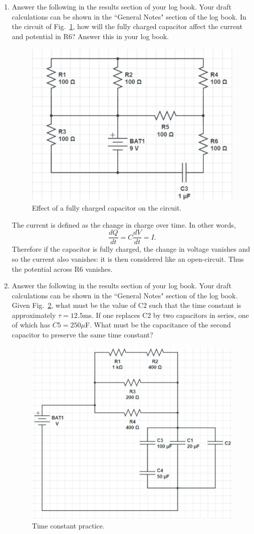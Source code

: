 \documentclass[12pt]{report}
\begin{document}
\begin{enumerate}
\item Answer the following in the results section of your log book. Your draft calculations can be shown in the ``General Notes" section of the log book. In the circuit of Fig.~\ref{Fig:lab2-session1-Rpractice}, how will the fully charged capacitor affect the current and potential in R6? Answer this in your log book.
\begin{figure}[h]
\centering
\includegraphics[width=0.6\linewidth]{lab2-session1-Rpractice}
\caption{Effect of a fully charged capacitor on the circuit.}
\label{Fig:lab2-session1-Rpractice}
\end{figure}

\begin{tcolorbox}[title=Answer]
The current is defined as the change in charge over time. In other words,
\begin{equation}
\frac{dQ}{dt} = C \frac{dV}{dt} = I.
\end{equation}
Therefore if the capacitor is fully charged, the change in voltage vanishes and so the current also vanishes: it is then considered like an open-circuit. Thus the potential across R6 vanishes.
\end{tcolorbox}

\item Answer the following in the results section of your log book. Your draft calculations can be shown in the ``General Notes" section of the log book. Given Fig.~\ref{Fig:lab2-session1-tau-practice}, what must be the value of C2 such that the time constant is approximately $\tau=12.5$ms. If one replaces C2 by two capacitors in series, one of which has $C5=250\mu$F. What must be the capacitance of the second capacitor to preserve the same time constant?
\begin{figure}[h]
\centering
\includegraphics[width=0.6\linewidth]{lab2-session1-Cpractice}
\caption{Time constant practice.}
\label{Fig:lab2-session1-tau-practice}
\end{figure}


\end{enumerate}
\end{document}
